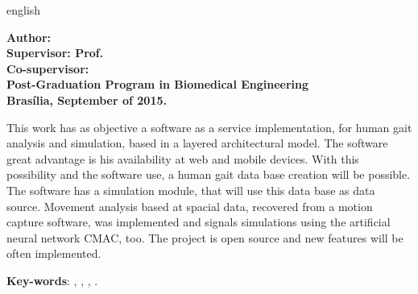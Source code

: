 \begin{resumo}[Abstract]
 \begin{otherlanguage*}{english}

 \begin{center}
\textbf{\imprimirTitle}
\end{center}

\begin{flushleft}
\footnotesize
\textbf{Author: \imprimirautor}\\
\textbf{Supervisor: Prof. \imprimirorientador} \\
\textbf{Co-supervisor: \imprimirmembroCoorientador} \\
\textbf{Post-Graduation Program in Biomedical Engineering} \\
\textbf{Brasília, September of 2015.}\newline
\end{flushleft}
 
This work has as objective a software as a service implementation, for human gait analysis and simulation, based in a layered architectural model. 
The software great advantage is his availability at web and mobile devices. 
With this possibility and the software use, a human gait data base creation will be possible.
The software has a simulation module, that will use this data base as data source.
Movement analysis based at spacial data, recovered from a motion capture software, was implemented and signals simulations using the artificial neural network CMAC, too.
The project is open source and new features will be often implemented.

   \vspace{\onelineskip}
 
   \noindent 
   \textbf{Key-words}: 	\imprimirpalavrachaveumingles, \imprimirpalavrachavedoisingles, 
			\imprimirpalavrachavetresingles, \imprimirpalavrachavequatroingles.

 \end{otherlanguage*}
\end{resumo}

